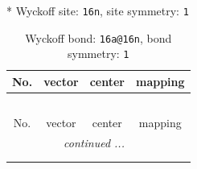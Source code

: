 \documentclass[fleqn,8pt]{jsarticle}
\begin{document}
* Wyckoff site: {\tt 16n}, site symmetry: {\tt 1}
\renewcommand{\arraystretch}{1.2}
\begin{longtable}{cccc}
\caption{Wyckoff bond: {\tt 16a@16n}, bond symmetry: {\tt 1}}
 \\
 \hline \hline
No. & vector & center & mapping \\ \hline \endfirsthead

\multicolumn{3}{l}{\tablename\ \thetable{}} \\
 \hline \hline
No. & vector & center & mapping \\ \hline \endhead

 \hline \hline
\multicolumn{3}{r}{\footnotesize\it continued ...} \\ \endfoot

 \hline \hline
\multicolumn{3}{r}{} \\ \endlastfoot


\end{longtable}
\end{document}
